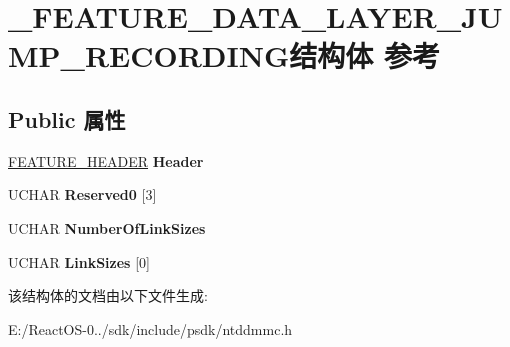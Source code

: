 \hypertarget{struct___f_e_a_t_u_r_e___d_a_t_a___l_a_y_e_r___j_u_m_p___r_e_c_o_r_d_i_n_g}{}\section{\+\_\+\+F\+E\+A\+T\+U\+R\+E\+\_\+\+D\+A\+T\+A\+\_\+\+L\+A\+Y\+E\+R\+\_\+\+J\+U\+M\+P\+\_\+\+R\+E\+C\+O\+R\+D\+I\+N\+G结构体 参考}
\label{struct___f_e_a_t_u_r_e___d_a_t_a___l_a_y_e_r___j_u_m_p___r_e_c_o_r_d_i_n_g}
\subsection*{Public 属性}
\begin{DoxyCompactItemize}
\item 
\mbox{\label{struct___f_e_a_t_u_r_e___d_a_t_a___l_a_y_e_r___j_u_m_p___r_e_c_o_r_d_i_n_g_a770d7c814ac9ac732c2889f21debe662}} 
\hyperlink{struct___f_e_a_t_u_r_e___h_e_a_d_e_r}{F\+E\+A\+T\+U\+R\+E\+\_\+\+H\+E\+A\+D\+ER} {\bfseries Header}
\item 
\mbox{\label{struct___f_e_a_t_u_r_e___d_a_t_a___l_a_y_e_r___j_u_m_p___r_e_c_o_r_d_i_n_g_a26f78ab7c21564633c45f831d092f116}} 
U\+C\+H\+AR {\bfseries Reserved0} \mbox{[}3\mbox{]}
\item 
\mbox{\label{struct___f_e_a_t_u_r_e___d_a_t_a___l_a_y_e_r___j_u_m_p___r_e_c_o_r_d_i_n_g_ac891f6ab2d767e22d6ee68477f9ccf56}} 
U\+C\+H\+AR {\bfseries Number\+Of\+Link\+Sizes}
\item 
\mbox{\label{struct___f_e_a_t_u_r_e___d_a_t_a___l_a_y_e_r___j_u_m_p___r_e_c_o_r_d_i_n_g_a48df5c4dec9ee976adad91f82c9ab500}} 
U\+C\+H\+AR {\bfseries Link\+Sizes} \mbox{[}0\mbox{]}
\end{DoxyCompactItemize}


该结构体的文档由以下文件生成\+:\begin{DoxyCompactItemize}
\item 
E\+:/\+React\+O\+S-\/0../sdk/include/psdk/ntddmmc.\+h\end{DoxyCompactItemize}
